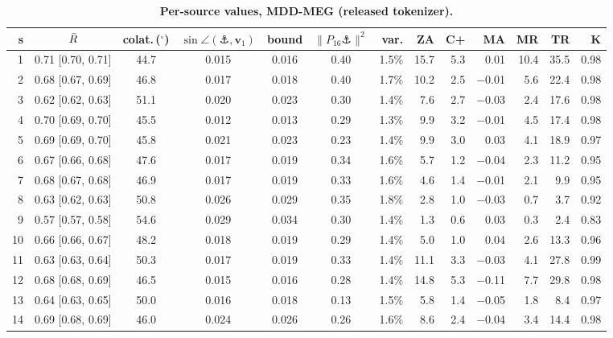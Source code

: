 \begin{table}[p]
\renewcommand{\baselinestretch}{1}
\caption{{\bf Per-source values, MDD-MEG (released tokenizer).}}
\label{tab:supp-mdd_meg}
\centering\scriptsize
\setlength{\tabcolsep}{2.5pt}
\begin{tabular}{rcccccrrrrrrr}
\toprule
\textbf{s} & $\bar{R}$ & \textbf{colat.}\,($^\circ$) & $\sin\angle(\anchor,\bm{v}_1)$ & \textbf{bound} & $\|P_{16}\anchor\|^2$ & \textbf{var.} & \textbf{ZA} & \textbf{C+} & \textbf{MA} & \textbf{MR} & \textbf{TR} & \textbf{K} \\
\midrule
1 & 0.71 [0.70, 0.71] & 44.7 & 0.015 & 0.016 & 0.40 & 1.5\% & 15.7 & 5.3 & 0.01 & 10.4 & 35.5 & 0.98 \\
2 & 0.68 [0.67, 0.69] & 46.8 & 0.017 & 0.018 & 0.40 & 1.7\% & 10.2 & 2.5 & $-$0.01 & 5.6 & 22.4 & 0.98 \\
3 & 0.62 [0.62, 0.63] & 51.1 & 0.020 & 0.023 & 0.30 & 1.4\% & 7.6 & 2.7 & $-$0.03 & 2.4 & 17.6 & 0.98 \\
4 & 0.70 [0.69, 0.70] & 45.5 & 0.012 & 0.013 & 0.29 & 1.3\% & 9.9 & 3.2 & $-$0.01 & 4.5 & 17.4 & 0.98 \\
5 & 0.69 [0.69, 0.70] & 45.8 & 0.021 & 0.023 & 0.23 & 1.4\% & 9.9 & 3.0 & 0.03 & 4.1 & 18.9 & 0.97 \\
6 & 0.67 [0.66, 0.68] & 47.6 & 0.017 & 0.019 & 0.34 & 1.6\% & 5.7 & 1.2 & $-$0.04 & 2.3 & 11.2 & 0.95 \\
7 & 0.68 [0.67, 0.68] & 46.9 & 0.017 & 0.019 & 0.33 & 1.6\% & 4.6 & 1.4 & $-$0.01 & 2.1 & 9.9 & 0.95 \\
8 & 0.63 [0.62, 0.63] & 50.8 & 0.026 & 0.029 & 0.35 & 1.8\% & 2.8 & 1.0 & $-$0.03 & 0.7 & 3.7 & 0.92 \\
9 & 0.57 [0.57, 0.58] & 54.6 & 0.029 & 0.034 & 0.30 & 1.4\% & 1.3 & 0.6 & 0.03 & 0.3 & 2.4 & 0.83 \\
10 & 0.66 [0.66, 0.67] & 48.2 & 0.018 & 0.019 & 0.29 & 1.4\% & 5.0 & 1.0 & 0.04 & 2.6 & 13.3 & 0.96 \\
11 & 0.63 [0.63, 0.64] & 50.3 & 0.017 & 0.019 & 0.33 & 1.4\% & 11.1 & 3.3 & $-$0.03 & 4.1 & 27.8 & 0.99 \\
12 & 0.68 [0.68, 0.69] & 46.5 & 0.015 & 0.016 & 0.28 & 1.4\% & 14.8 & 5.3 & $-$0.11 & 7.7 & 29.8 & 0.98 \\
13 & 0.64 [0.63, 0.65] & 50.0 & 0.016 & 0.018 & 0.13 & 1.5\% & 5.8 & 1.4 & $-$0.05 & 1.8 & 8.4 & 0.97 \\
14 & 0.69 [0.68, 0.69] & 46.0 & 0.024 & 0.026 & 0.26 & 1.6\% & 8.6 & 2.4 & $-$0.04 & 3.4 & 14.4 & 0.98 \\

\end{tabular}
\end{table}
